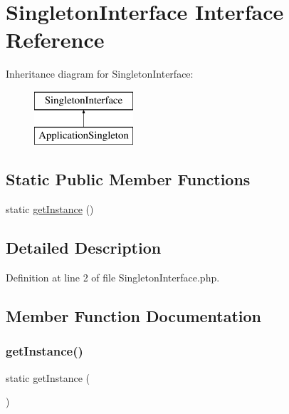 \hypertarget{interface_singleton_interface}{}\section{Singleton\+Interface Interface Reference}
\label{interface_singleton_interface}
Inheritance diagram for Singleton\+Interface\+:\begin{figure}[H]
\begin{center}
\leavevmode
\includegraphics[height=2.000000cm]{interface_singleton_interface}
\end{center}
\end{figure}
\subsection*{Static Public Member Functions}
\begin{DoxyCompactItemize}
\item 
static \hyperlink{interface_singleton_interface_ac93fbec81f07e5d15f80db907e63dc10}{get\+Instance} ()
\end{DoxyCompactItemize}


\subsection{Detailed Description}


Definition at line 2 of file Singleton\+Interface.\+php.



\subsection{Member Function Documentation}
\hypertarget{interface_singleton_interface_ac93fbec81f07e5d15f80db907e63dc10}{}\label{interface_singleton_interface_ac93fbec81f07e5d15f80db907e63dc10} 
\subsubsection{\texorpdfstring{get\+Instance()}{getInstance()}}
{\footnotesize\ttfamily static get\+Instance (\begin{DoxyParamCaption}{ }\end{DoxyParamCaption})\hspace{0.3cm}{\ttfamily [static]}}



